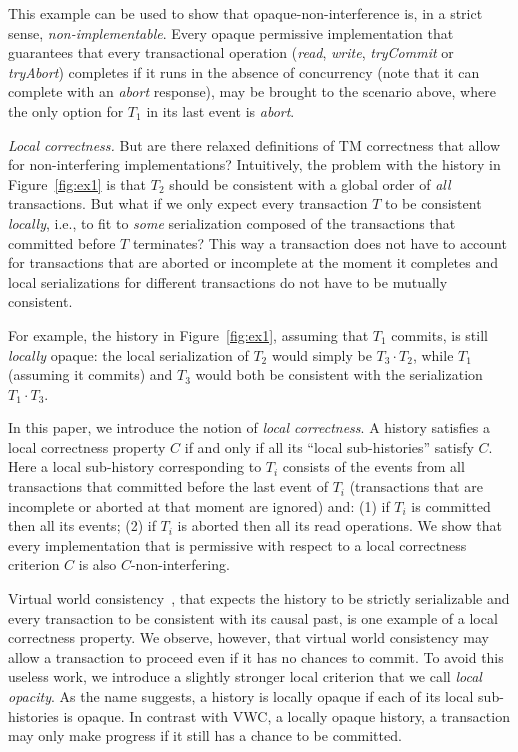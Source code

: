 \documentclass{llncs}
\newcommand{\id}[1]{\mbox{\textit{#1}}}\newcommand{\res}[1]{\mbox{\textbf{#1}}}
\newcommand{\op} {operation}
\begin{document}
This example can be used to show that opaque-non-interference
is, in a strict sense, \emph{non-implementable}. 
Every
opaque permissive implementation that guarantees that every
transactional operation (\id{read}, \id{write}, \id{tryCommit} or \id{tryAbort})
completes if it runs in the absence of concurrency (note that it can
complete with an \emph{abort} response), may be brought to the
scenario above, where the only option for $T_1$ in its last event is \textit{abort}.      

\vspace{1mm}
\noindent
\textit{Local correctness.} 
But are there relaxed definitions of TM correctness that allow for
non-interfering implementations? Intuitively, the problem with the
history  in  Figure~\ref{fig:ex1} is that $T_2$ should be consistent
with a global order of \emph{all} transactions. But what if we only
expect every transaction $T$ to be consistent \emph{locally}, i.e., to fit to
\emph{some} serialization composed of
the transactions that committed before $T$ terminates? 
This way a transaction does not have to account for
transactions that are aborted or incomplete 
at the moment it completes and local serializations for different
transactions do not have to be mutually consistent. 

For example, the history in Figure~\ref{fig:ex1}, assuming that $T_1$
commits, is still \emph{locally} opaque:  
the local serialization of $T_2$ would simply be $T_3\cdot T_2$, while $T_1$
(assuming it commits) and $T_3$ would both be consistent with the
serialization $T_1\cdot T_3$.

In this paper, we introduce the notion of \emph{local correctness}. 
A history satisfies a local correctness property $C$ if
and only if all its ``local sub-histories'' satisfy $C$. Here a local
sub-history corresponding to $T_i$ consists of the events from all transactions that committed before the last event of $T_i$ (transactions that are incomplete or aborted at that moment are ignored) and: (1) if $T_i$ is committed then all its events; (2) if $T_i$ is aborted then all its read \op{s}.
We show that every implementation that is permissive with respect to a local correctness
criterion $C$ is also $C$-non-interfering. 

Virtual world consistency~\cite{ImbsRay:2009:SIROCCO}, that expects
the history to be strictly serializable and  
every transaction to be consistent with 
its causal past, is one example of a local correctness property.
We observe, however, that virtual world consistency may allow a transaction to
proceed even if it has no chances to commit. 
To avoid this useless work, we introduce a slightly stronger 
local criterion that we call \emph{local opacity}. As the name
suggests, a history is locally opaque if each of its local
sub-histories is opaque. 
In contrast with VWC, a locally opaque history, a transaction may only make progress if
it still has a chance to be committed. 
\end{document}
